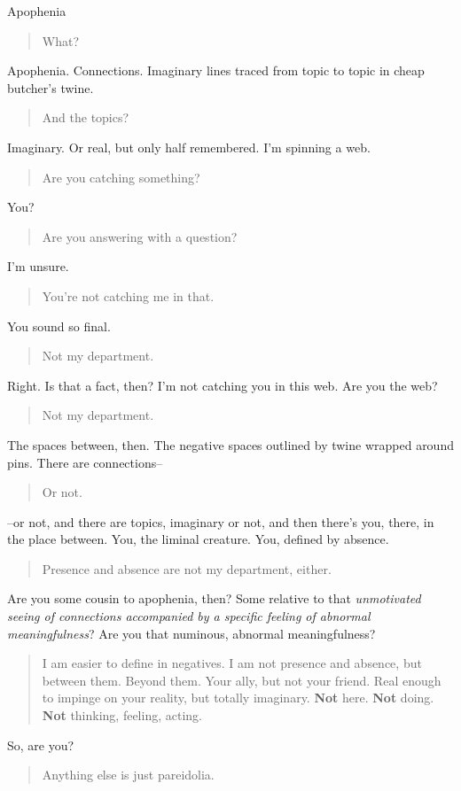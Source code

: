 Apophenia

\begin{quote}
What?
\end{quote}

Apophenia. Connections. Imaginary lines traced from topic to topic in cheap butcher's twine.

\begin{quote}
And the topics?
\end{quote}

Imaginary. Or real, but only half remembered. I'm spinning a web.

\begin{quote}
Are you catching something?
\end{quote}

You?

\begin{quote}
Are you answering with a question?
\end{quote}

I'm unsure.

\begin{quote}
You're not catching me in that.
\end{quote}

You sound so final.

\begin{quote}
Not my department.
\end{quote}

Right. Is that a fact, then? I'm not catching you in this web. Are you the web?

\begin{quote}
Not my department.
\end{quote}

The spaces between, then. The negative spaces outlined by twine wrapped around pins. There are connections--

\begin{quote}
Or not.
\end{quote}

--or not, and there are topics, imaginary or not, and then there's you, there, in the place between. You, the liminal creature. You, defined by absence.

\begin{quote}
Presence and absence are not my department, either.
\end{quote}

Are you some cousin to apophenia, then? Some relative to that \emph{unmotivated seeing of connections accompanied by a specific feeling of abnormal meaningfulness}? Are you that numinous, abnormal meaningfulness?

\begin{quote}
I am easier to define in negatives. I am not presence and absence, but between them. Beyond them. Your ally, but not your friend. Real enough to impinge on your reality, but totally imaginary. \textbf{Not} here. \textbf{Not} doing. \textbf{Not} thinking, feeling, acting.
\end{quote}

So, are you?

\begin{quote}
Anything else is just pareidolia.
\end{quote}

